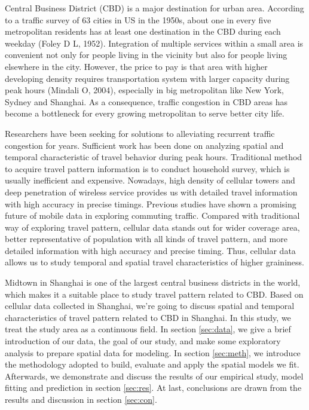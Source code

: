 \documentclass[hidelinks,12pt]{article}
\begin{document}
	Central Business District (CBD) is a major destination for urban area. According to a traffic survey of 63 cities in US in the 1950s, about one in every five metropolitan residents has at least one destination in the CBD during each weekday (Foley D L, 1952). Integration of multiple services within a small area is convenient not only for people living in the vicinity but also for people living elsewhere in the city. However, the price to pay is that area with higher developing density requires transportation system with larger capacity during peak hours (Mindali O, 2004), especially in big metropolitan like New York, Sydney and Shanghai. As a consequence, traffic congestion in CBD areas has become a bottleneck for every growing metropolitan to serve better city life.
	
	Researchers have been seeking for solutions to alleviating recurrent traffic congestion for years. Sufficient work has been done on analyzing spatial and temporal characteristic of travel behavior during peak hours. Traditional method to acquire travel pattern information is to conduct household survey, which is usually inefficient and expensive. Nowadays, high density of cellular towers and deep penetration of wireless service provides us with detailed travel information with high accuracy in precise timings. Previous studies have shown a promising future of mobile data in exploring commuting traffic. Compared with traditional way of exploring travel pattern, cellular data stands out for wider coverage area, better representative of population with all kinds of travel pattern, and more detailed information with high accuracy and precise timing. Thus, cellular data allows us to study temporal and spatial travel characteristics of higher graininess. 
	
	Midtown in Shanghai is one of the largest central business districts in the world, which makes it a suitable place to study travel pattern related to CBD. Based on cellular data collected in Shanghai, we're going to discuss spatial and temporal characteristics of travel pattern related to CBD in Shanghai. In this study, we treat the study area as a continuous field. In section \ref{sec:data}, we give a brief introduction of our data, the goal of our study, and make some exploratory analysis to prepare spatial data for modeling. In section \ref{sec:meth}, we introduce the methodology adopted to build, evaluate and apply the spatial models we fit. Afterwards, we demonstrate and discuss the results of our empirical study, model fitting and prediction in section \ref{sec:res}. At last, conclusions are drawn from the results and discussion in section \ref{sec:con}. 	
	
\end{document}
